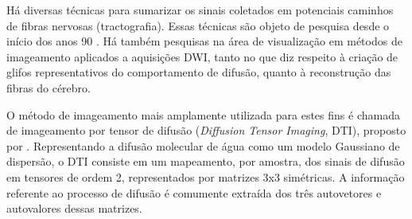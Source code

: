 \documentclass[
    12pt,                %
    oneside,            %
    a4paper,            %
    english,            %
    french,                %
    spanish,            %
    brazil                %
    ]{abntex2}
\begin{document}





Há diversas técnicas para sumarizar os sinais coletados em potenciais caminhos de fibras nervosas (tractografia). Essas técnicas são objeto de pesquisa desde o início dos anos 90 \cite{descoteaux2015}. Há também pesquisas na área de visualização em métodos de imageamento aplicados a aquisições DWI, tanto no que diz respeito à criação de glifos representativos do comportamento de difusão, quanto à reconstrução das fibras do cérebro.

O método de imageamento mais amplamente utilizada para estes fins é chamada de imageamento por tensor de difusão (\textit{Diffusion Tensor Imaging}, DTI), proposto por . %
Representando a difusão molecular de água como um modelo Gaussiano de dispersão,  o DTI consiste em um mapeamento, por amostra, dos sinais de difusão em tensores de ordem 2, representados por matrizes 3x3 simétricas. A informação referente ao processo de difusão é comumente extraída dos três autovetores e autovalores dessas matrizes.
\end{document}
